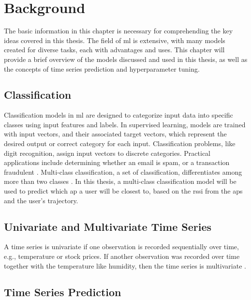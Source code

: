 \chapter{Background}\label{ch:background}

The basic information in this chapter is necessary for comprehending the key ideas covered in this thesis.
The field of \ac{ml} is extensive, with many models created for diverse tasks, each with advantages and uses.
This chapter will provide a brief overview of the models discussed and used in this thesis, as well as the concepts of time series prediction and hyperparameter tuning.

\section{Classification}

Classification models in \ac{ml} are designed to categorize input data into specific classes using input features and labels.
In supervised learning, models are trained with input vectors, and their associated target vectors, which represent the desired output or correct category for each input.
Classification problems, like digit recognition, assign input vectors to discrete categories.
Practical applications include determining whether an email is spam, or a transaction fraudulent \cite{binary-classification}.
Multi-class classification, a set of classification, differentiates among more than two classes \cite{BishopPatternRecognition}.
In this thesis, a multi-class classification model will be used to predict which \ac{ap} a user will be closest to, based on the \ac{rssi} from the \acp{ap} and the user's trajectory.


\section{Univariate and Multivariate Time Series}

A time series is univariate if one observation is recorded sequentially over time, e.g., temperature or stock prices.
If another observation was recorded over time together with the temperature like humidity, then the time series is multivariate \cite{brownleeDeepLearningTime}.

\section{Time Series Prediction}

